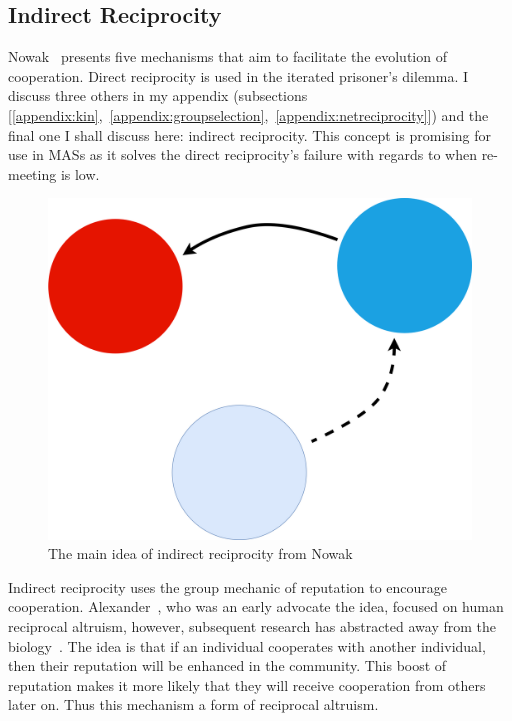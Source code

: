\documentclass[]{final_report}
\begin{document}
\subsection{Indirect Reciprocity}
\label{sec:indir}
Nowak~\cite{five_rules_coop} presents five mechanisms that aim to facilitate the evolution of cooperation. Direct reciprocity is used in the iterated prisoner's dilemma. I discuss three others in my appendix (subsections [\ref{appendix:kin},~\ref{appendix:groupselection},~\ref{appendix:netreciprocity}]) and the final one I shall discuss here: indirect reciprocity. This concept is promising for use in MASs as it solves the direct reciprocity's failure with regards to when re-meeting is low.\par 
\begin{figure}
\vspace{-20pt}
\begin{framed}
	\center
	\includegraphics[width=\textwidth]{IndirectRec.png}
	\caption{The main idea of indirect reciprocity from Nowak~\cite{five_rules_coop}}
	\label{fig:indir_rec}
\end{framed}
\vspace{-20pt}
\end{figure}
Indirect reciprocity uses the group mechanic of reputation to encourage cooperation. Alexander~\cite{alexander1987biology}, who was an early advocate the idea, focused on human reciprocal altruism, however, subsequent research has abstracted away from the biology~\cite{phelps_game_theoretic_analysis, imagevsstanding, evol_indirect_image, evoldirindir, five_rules_coop, leimarhammer, sugden2004economics, gossip_alt, mui2002computational}. The idea is that if an individual cooperates with another individual, then their reputation will be enhanced in the community. This boost of reputation makes it more likely that they will receive cooperation from others later on. Thus this mechanism a form of reciprocal altruism.\par
\end{document}
